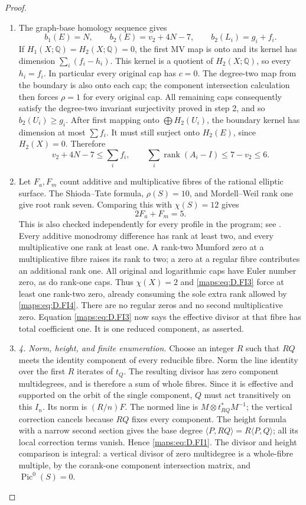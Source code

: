 \begin{proof}
\begin{enumerate}[label=\arabic*.,leftmargin=*]
\item The graph-base homology sequence gives
\[
 b_1(E)=N,\qquad b_2(E)=v_2+4N-7,\qquad b_2(L_i)=g_i+f_i.
\]
If $H_1(X;\mathbb Q)=H_2(X;\mathbb Q)=0$, the first MV map is
onto and its kernel has dimension $\sum_i(f_i-h_i)$. This kernel
is a quotient of $H_2(X;\mathbb Q)$, so every $h_i=f_i$.
In particular every original cap has $c=0$. The degree-two map
from the boundary is also onto each cap; the component intersection
calculation then forces $\rho=1$ for every original cap.
All remaining caps consequently satisfy the degree-two invariant
surjectivity proved in step 2, and so $b_2(U_i)\ge g_i$.
After first mapping onto $\bigoplus H_2(U_i)$, the boundary kernel
has dimension at most $\sum f_i$. It must still surject onto
$H_2(E)$, since $H_2(X)=0$. Therefore
\[
 v_2+4N-7\le\sum_i f_i,
 \qquad\sum_i\operatorname{rank}(A_i-I)\le7-v_2\le6.          \tag{D.FI4}\label{maps:eq:D.FI4}
\]

\item Let $F_a,F_m$ count additive and multiplicative fibres of the
rational elliptic surface. The Shioda--Tate formula, $\rho(S)=10$,
and Mordell--Weil rank one give root rank seven. Comparing this
with $\chi(S)=12$ gives
\[
                            2F_a+F_m=5.
\]
This is also checked independently for every profile in the program;
see \cite[Theorem 6.3 and Corollary 6.13]{manSS10}.
Every additive monodromy difference has rank at least two, and
every multiplicative one rank at least one. A rank-two Mumford
zero at a multiplicative fibre raises its rank to two; a zero at
a regular fibre contributes an additional rank one. All original
and logarithmic caps have Euler number zero, as do rank-one caps.
Thus $\chi(X)=2$ and \eqref{maps:eq:D.FI3} force at least one rank-two zero,
already consuming the sole extra rank allowed by \eqref{maps:eq:D.FI4}.
There are no regular zeros and no second multiplicative zero.
Equation \eqref{maps:eq:D.FI3} now says the effective divisor at that fibre has
total coefficient one. It is one reduced component, as asserted.

\item \emph{4. Norm, height, and finite enumeration.}
Choose an integer $R$ such that $RQ$ meets the identity component
of every reducible fibre. Norm the line identity over the first
$R$ iterates of $t_Q$. The resulting divisor has zero component
multidegrees, and is therefore a sum of whole fibres. Since it is
effective and supported on the orbit of the single component,
$Q$ must act transitively on this $I_n$. Its norm is $(R/n)F$.
The normed line is
$M\otimes t_{RQ}^*M^{-1}$; the vertical correction cancels because
$RQ$ fixes every component. The height formula with a narrow second
section gives the base degree
$\langle P,RQ\rangle=R\langle P,Q\rangle$; all its local correction
terms vanish. Hence \eqref{maps:eq:D.FI1}. The divisor and height comparison is
integral: a vertical divisor of zero multidegree is a whole-fibre
multiple, by the corank-one component intersection matrix, and
$\operatorname{Pic}^0(S)=0$.


\end{enumerate}
\end{proof}
